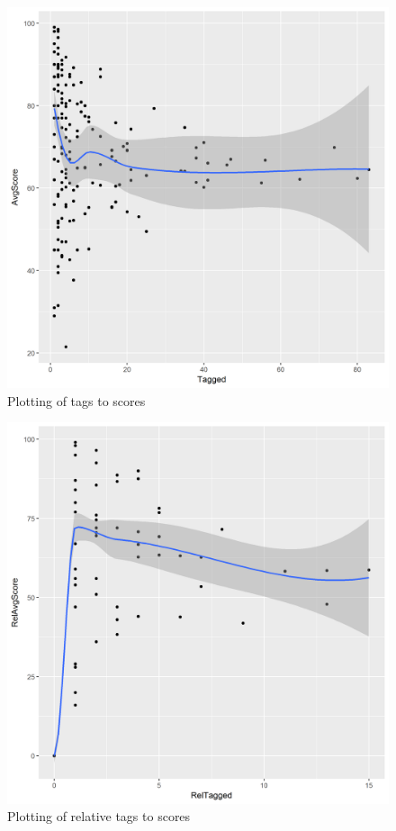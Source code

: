 \documentclass[figures_tabs.tex]{subfiles}
\begin{document}
\begin{figure}[H]
    \centering
    \includegraphics[scale=0.5]{img/tag_score.png}
    \caption{Plotting of tags to scores}
    \label{fig:tag_score}
\end{figure}

\begin{figure}[H]
    \centering
    \includegraphics[scale=0.5]{img/tag_score_rel.png}
    \caption{Plotting of relative tags to scores}
    \label{fig:tag_score_rel}
\end{figure}
\end{document}
